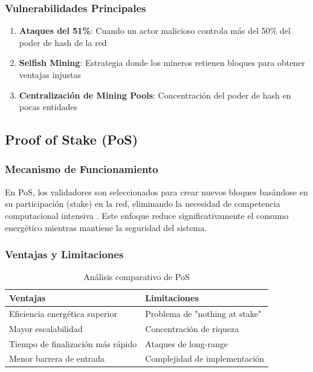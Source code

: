 \documentclass[spanish,12pt,letterpaper]{report}
\begin{document}
\subsubsection{Vulnerabilidades Principales}

\begin{enumerate}
    \item \textbf{Ataques del 51\%}: Cuando un actor malicioso controla más del 50\% del poder de hash de la red
    \item \textbf{Selfish Mining}: Estrategia donde los mineros retienen bloques para obtener ventajas injustas
    \item \textbf{Centralización de Mining Pools}: Concentración del poder de hash en pocas entidades
\end{enumerate}

\subsection{Proof of Stake (PoS)}

\subsubsection{Mecanismo de Funcionamiento}

En PoS, los validadores son seleccionados para crear nuevos bloques basándose en su participación (stake) en la red, eliminando la necesidad de competencia computacional intensiva \cite{king2012ppcoin}. Este enfoque reduce significativamente el consumo energético mientras mantiene la seguridad del sistema.

\subsubsection{Ventajas y Limitaciones}

\begin{table}[h]
\centering
\begin{tabular}{|p{6cm}|p{6cm}|}
\hline
\textbf{Ventajas} & \textbf{Limitaciones} \\
\hline
Eficiencia energética superior & Problema de "nothing at stake" \\
Mayor escalabilidad & Concentración de riqueza \\
Tiempo de finalización más rápido & Ataques de long-range \\
Menor barrera de entrada & Complejidad de implementación \\
\hline
\end{tabular}
\caption{Análisis comparativo de PoS}
\label{tab:pos-comparison}
\end{table}
\end{document}
